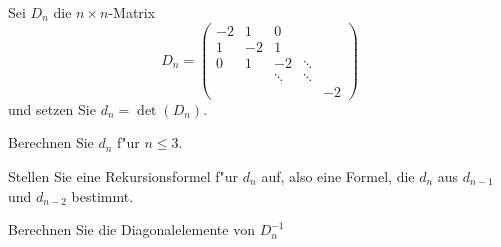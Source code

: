 Sei $D_n$ die $n\times n$-Matrix
\[
D_n=\begin{pmatrix}
-2& 1&     0&      &  \\
 1&-2&     1&      &  \\
 0& 1&    -2&\ddots&  \\
  &  &\ddots&\ddots&  \\
  &  &      &      &-2
\end{pmatrix}
\]
und setzen Sie $d_n=\det(D_n)$.
\begin{teilaufgaben}
\item Berechnen Sie $d_n$ f"ur $n\le 3$.
\item Stellen Sie eine Rekursionsformel f"ur $d_n$ auf, also eine Formel,
die $d_{n}$ aus  $d_{n-1}$ und $d_{n-2}$ bestimmt.
\item Berechnen Sie die Diagonalelemente von $D_n^{-1}$
\end{teilaufgaben}

